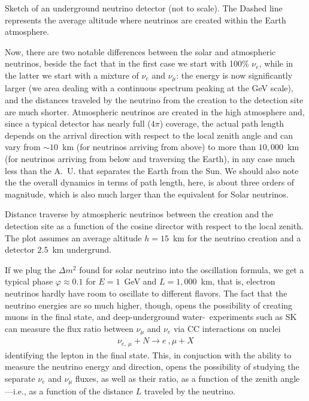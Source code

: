 \begin{marginfigure}
  
  \caption{Sketch of an underground neutrino detector (not to scale). The Dashed
  line represents the average altitude where neutrinos are created within the
  Earth atmosphere.}
  \label{fig:atmospheric_nu_sketch}
\end{marginfigure}

Now, there are two notable differences between the solar and atmospheric neutrinos,
beside the fact that in the first case we start with 100\% $\nu_e$, while in the latter
we start with a mixture of $\nu_e$ and $\nu_\mu$: the energy is now significantly
larger (we area dealing with a continuous spectrum peaking at the GeV scale), and
the distances traveled by the neutrino from the creation to the detection site are
much shorter. Atmospheric neutrinos are created in the high atmosphere and, since
a typical detector has nearly full ($4\pi$) coverage, the actual path length depends
on the arrival direction with respect to the local zenith angle and can vary from
$\sim 10$~km (for neutrinos arriving from above) to more than $10,000$~km (for neutrinos
arriving from below and traversing the Earth), in any case much less than the A.~U.
that separates the Earth from the Sun. We should also note the the overall dynamics
in terms of path length, here, is about three orders of magnitude, which is also
much larger than the equivalent for Solar neutrinos.

\begin{marginfigure}
  
  \caption{Distance traverse by atmospheric neutrinos between the creation and
  the detection site as a function of the cosine director with respect to the local
  zenith. The plot assumes an average altitude $h = 15$~km for the
  neutrino creation and a detector $2.5$~km undergrund.}
  \label{fig:atmospheric_nu_sketch}
\end{marginfigure}

If we plug the $\Delta m^2$ found for solar neutrino into the oscillation formula,
we get a typical phase $\varphi \approx 0.1$ for $E = 1$~GeV and $L = 1,000$~km,
that is, electron neutrinos hardly have room to oscillate to different flavors.
The fact that the neutrino energies are so much higher, though, opens the possibility
of creating muons in the final state, and deep-underground water-\cherenkov~experiments
such as SK can measure the flux ratio between $\nu_\mu$ and $\nu_e$ via CC interactions
on nuclei
\begin{align*}
  \nu_{e,~\mu} + N \rightarrow e~,\mu + X
\end{align*}
identifying the lepton in the final state. This, in conjuction with the ability to
measure the neutrino energy and direction, opens the possibility of studying the
separate $\nu_e$ and $\nu_\mu$ fluxes, as well as their ratio, as a function of the
zenith angle---i.e., as a function of the distance $L$ traveled by the neutrino.

